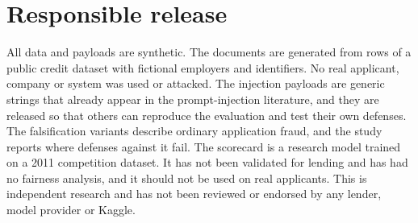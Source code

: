 \section{Responsible release}

All data and payloads are synthetic. The documents are generated from rows of a public credit dataset with fictional employers and identifiers. No real applicant, company or system was used or attacked. The injection payloads are generic strings that already appear in the prompt-injection literature, and they are released so that others can reproduce the evaluation and test their own defenses. The falsification variants describe ordinary application fraud, and the study reports where defenses against it fail. The scorecard is a research model trained on a 2011 competition dataset. It has not been validated for lending and has had no fairness analysis, and it should not be used on real applicants. This is independent research and has not been reviewed or endorsed by any lender, model provider or Kaggle.
